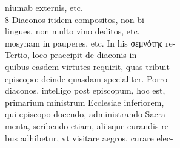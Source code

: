 \documentclass{article}
\begin{document}
\begin{pages}
                niumab externis, etc. \\
                8 Diaconos itidem compositos, non bi- \\
                lingues, non multo vino deditos, etc. \\
                mosynam in pauperes, etc. In his σεμνότης re- \\
                Tertio, loco praecipit de diaconis in \\
                quibus easdem virtutes requirit, quas tribuit \\
                episcopo: deinde quasdam specialiter. Porro \\
                diaconos, intelligo post episcopum, hoc est, \\
                primarium ministrum Ecclesiae inferiorem, \\
                qui episcopo docendo, administrando Sacra- \\
                menta, scribendo etiam, aliisque curandis re- \\
                bus adhibetur, vt visitare aegros, curare elec- \\
                

\end{pages}
\end{document}
